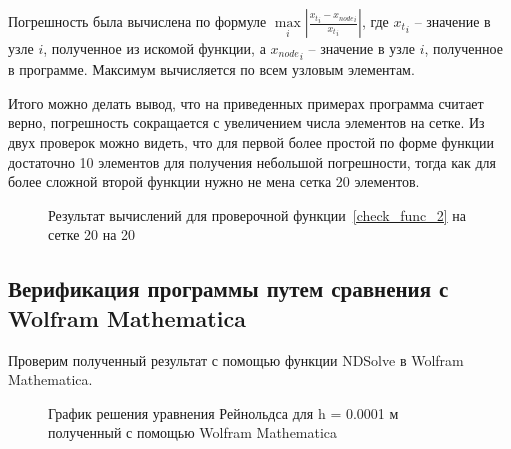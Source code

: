 \documentclass[a4paper,14pt]{extarticle}
\begin{document}
Погрешность была вычислена по формуле $\underset{i}{\max} | \frac{{x_t}_i - {x_{node}}_i}{{x_t}_i} |$, где ${x_t}_i$ -- значение в узле $i$, полученное из искомой функции, а ${x_{node}}_i$ -- значение в узле $i$, полученное в программе. Максимум вычисляется по всем узловым элементам.

Итого можно делать вывод, что на приведенных примерах программа считает верно, погрешность сокращается с увеличением числа элементов на сетке. Из двух проверок можно видеть, что для первой более простой по форме функции достаточно 10 элементов для получения небольшой погрешности, тогда как для более сложной второй функции нужно не мена сетка 20 элементов.

\begin{figure}[!htbp]
	\caption{Результат вычислений для проверочной функции~\eqref{check_func_2} на сетке 20 на 20}
	\label{res_check_func_2}
\end{figure}



\subsection{Верификация программы путем сравнения с Wolfram Mathematica}

Проверим полученный результат с помощью функции NDSolve в Wolfram Mathematica.

\begin{figure}[!htbp]
	\caption{График решения уравнения Рейнольдса для h = 0.0001 м полученный с помощью Wolfram Mathematica}
	\label{exactSolutionConst}
\end{figure}
\end{document}
